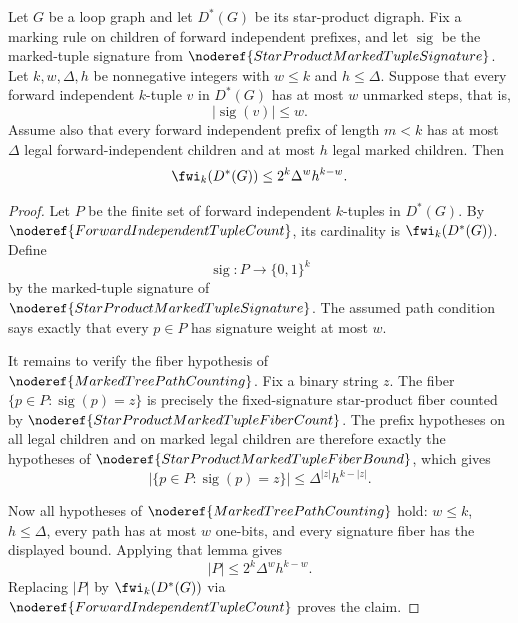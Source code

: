 \begin{helper}
Let \(G\) be a loop graph and let \(D^*(G)\) be its star-product digraph.
Fix a marking rule on children of forward independent prefixes, and let
\(\operatorname{sig}\) be the marked-tuple signature from
\(\noderef{StarProductMarkedTupleSignature}\).  Let \(k,w,\Delta,h\) be
nonnegative integers with \(w\le k\) and \(h\le\Delta\).  Suppose that every
forward independent \(k\)-tuple \(v\) in \(D^*(G)\) has at most \(w\)
unmarked steps, that is,
\[
  |\operatorname{sig}(v)|\le w.
\]
Assume also that every forward independent prefix of length \(m<k\) has at
most \(\Delta\) legal forward-independent children and at most \(h\) legal
marked children.  Then
\[
  \fwi_k(D^*(G))\le 2^k\Delta^w h^{k-w}.
\]
\end{helper}
\begin{proof}
Let \(P\) be the finite set of forward independent \(k\)-tuples in
\(D^*(G)\).  By \(\noderef{ForwardIndependentTupleCount}\), its cardinality
is \(\fwi_k(D^*(G))\).  Define
\[
  \operatorname{sig}:P\to\{0,1\}^k
\]
by the marked-tuple signature of \(\noderef{StarProductMarkedTupleSignature}\).
The assumed path condition says exactly that every \(p\in P\) has signature
weight at most \(w\).

It remains to verify the fiber hypothesis of
\(\noderef{MarkedTreePathCounting}\).  Fix a binary string \(z\).  The fiber
\(\{p\in P:\operatorname{sig}(p)=z\}\) is precisely the fixed-signature
star-product fiber counted by \(\noderef{StarProductMarkedTupleFiberCount}\).
The prefix hypotheses on all legal children and on marked legal children are
therefore exactly the hypotheses of
\(\noderef{StarProductMarkedTupleFiberBound}\), which gives
\[
  |\{p\in P:\operatorname{sig}(p)=z\}|
  \le \Delta^{|z|}h^{k-|z|}.
\]

Now all hypotheses of \(\noderef{MarkedTreePathCounting}\) hold: \(w\le k\),
\(h\le\Delta\), every path has at most \(w\) one-bits, and every signature
fiber has the displayed bound.  Applying that lemma gives
\[
  |P|\le 2^k\Delta^w h^{k-w}.
\]
Replacing \(|P|\) by \(\fwi_k(D^*(G))\) via
\(\noderef{ForwardIndependentTupleCount}\) proves the claim.
\end{proof}
